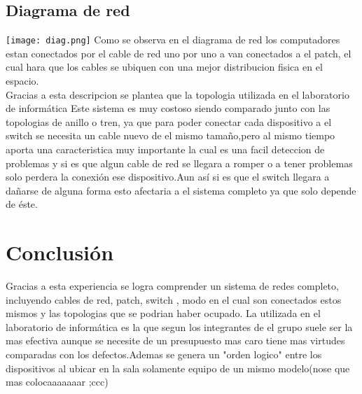 \documentclass{udpreport}
\begin{document}
	\section{Diagrama de red}
		\texttt{[image: diag.png]}
		Como se observa en el diagrama de red los computadores estan conectados por el cable de red uno por uno 
		a van conectados a el patch, el cual hara que los cables se ubiquen con una mejor distribucion fisica 
		en el espacio.\\
		Gracias a esta descripcion se plantea que la topologia utilizada en el laboratorio de informática
		Este sistema es muy costoso siendo comparado junto con las topologias de anillo o tren, ya que para poder
		conectar cada dispositivo a el switch se necesita un cable nuevo de el mismo tamaño,pero al mismo tiempo
		aporta una caracteristica muy importante la cual es una facil deteccion de problemas y si es que algun
		cable de red se llegara a romper o a tener problemas solo perdera la conexión  ese dispositivo.Aun así 
		si es que el switch llegara a dañarse de alguna forma esto afectaria a el sistema completo ya que solo
		depende de éste.
\chapter{Conclusión}
                Gracias a esta experiencia se logra comprender un sistema de redes completo, incluyendo cables de red, patch, switch ,                 modo en el cual son conectados estos mismos y las topologias que se podrian haber ocupado. La utilizada en el                         laboratorio de informática es la que segun los integrantes de el grupo suele ser la mas efectiva aunque se necesite de                 un presupuesto mas caro tiene mas virtudes comparadas con los  defectos.Ademas se genera un "orden logico" entre los                  dispositivos al ubicar en la sala solamente equipo de un mismo modelo(nose que mas colocaaaaaaar ;ccc)
\end{document}
